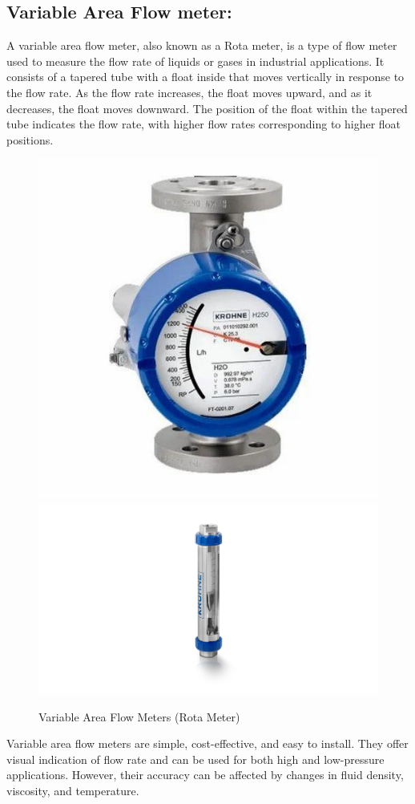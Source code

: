 \subsection{Variable Area Flow meter:}

A variable area flow meter, also known as a Rota meter, is a type of
flow meter used to measure the flow rate of liquids or gases in
industrial applications. It consists of a tapered tube with a float
inside that moves vertically in response to the flow rate. As the flow
rate increases, the float moves upward, and as it decreases, the float
moves downward. The position of the float within the tapered tube
indicates the flow rate, with higher flow rates corresponding to higher
float positions.

\begin{figure}[h!]
    \centering
    \includegraphics[width=0.45\linewidth]{figs/flowmeters/image15.jpg}
    \includegraphics[width=0.7\linewidth]{figs/flowmeters/image16.png}
    \caption{Variable Area Flow Meters (Rota Meter)}
    \label{fig:rota_meter}
\end{figure}


Variable area flow meters are simple, cost-effective, and easy to
install. They offer visual indication of flow rate and can be used for
both high and low-pressure applications. However, their accuracy can be
affected by changes in fluid density, viscosity, and temperature.

